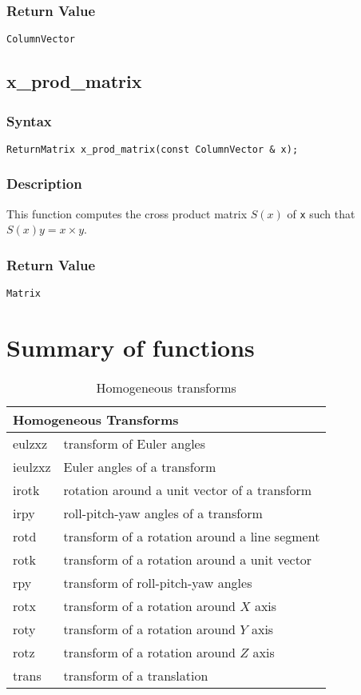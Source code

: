 \documentclass[11pt,fleqn,letterpaper]{report}
\begin{document}
\subsubsection*{Return Value}

{\tt ColumnVector}

\newpage

\subsection*{x\_prod\_matrix}
\subsubsection*{Syntax}
\begin{verbatim}
ReturnMatrix x_prod_matrix(const ColumnVector & x);
\end{verbatim}
\subsubsection*{Description}
This function computes the cross product matrix $S(x)$ of {\tt x} such
that $S(x)y = x \times y$.

\subsubsection*{Return Value}

{\tt Matrix}
\newpage

\section{Summary of functions}

\begin{table}[htbp]
\caption{Homogeneous transforms}
\label{tab:commandsum1}
\begin{center}
\begin{tabular}{||l|l||}
\hline
\hline
\multicolumn{2}{||l||}{{\bf Homogeneous Transforms}} \\
\hline
\hline
eulzxz & transform of Euler angles \\
\hline
ieulzxz & Euler angles of a transform \\
\hline
irotk & rotation around a unit vector of a transform \\
\hline
irpy & roll-pitch-yaw angles of a transform \\
\hline
rotd & transform of a rotation around a line segment \\
\hline
rotk & transform of a rotation around a unit vector \\
\hline
rpy & transform of roll-pitch-yaw angles \\
\hline
rotx & transform of a rotation around $X$ axis \\
\hline
roty & transform of a rotation around $Y$ axis \\
\hline
rotz & transform of a rotation around $Z$ axis \\
\hline
trans & transform of a translation \\
\hline
\hline
\end{tabular}
\end{center}
\end{table}
\end{document}
